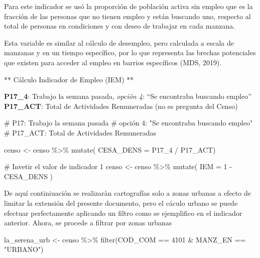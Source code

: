 \documentclass[
  letterpaper,
  DIV=11,
  numbers=noendperiod]{scrreprt}
\newenvironment{Shaded}{\begin{snugshade}}{\end{snugshade}}
\newcommand{\AttributeTok}[1]{\textcolor[rgb]{0.40,0.45,0.13}{#1}}
\newcommand{\CommentTok}[1]{\textcolor[rgb]{0.37,0.37,0.37}{#1}}
\newcommand{\DecValTok}[1]{\textcolor[rgb]{0.68,0.00,0.00}{#1}}
\newcommand{\FunctionTok}[1]{\textcolor[rgb]{0.28,0.35,0.67}{#1}}
\newcommand{\NormalTok}[1]{\textcolor[rgb]{0.00,0.23,0.31}{#1}}
\newcommand{\OtherTok}[1]{\textcolor[rgb]{0.00,0.23,0.31}{#1}}
\newcommand{\SpecialCharTok}[1]{\textcolor[rgb]{0.37,0.37,0.37}{#1}}
\newcommand{\StringTok}[1]{\textcolor[rgb]{0.13,0.47,0.30}{#1}}
\begin{document}
Para este indicador se usó la proporción de población activa sin empleo
que es la fracción de las personas que no tienen empleo y están buscando
uno, respecto al total de personas en condiciones y con deseo de
trabajar en cada manzana.

Esta variable es similar al cálculo de desempleo, pero calculada a
escala de manzanas y en un tiempo específico, por lo que representa las
brechas potenciales que existen para acceder al empleo en barrios
específicos (MDS, 2019).

** Cálculo Indicador de Empleo (IEM) **

\textbf{P17\_4}: Trabajo la semana pasada, \emph{opción 4}: ``Se
encontraba buscando empleo''\\
\textbf{P17\_ACT}: Total de Actividades Remuneradas (no es pregunta del
Censo)

\begin{Shaded}
\begin{Highlighting}[]
\CommentTok{\# P17: Trabajo la semana pasada}
\CommentTok{\# opción \textasciigrave{}4\textasciigrave{}: "Se encontraba buscando empleo"}
\CommentTok{\# P17\_ACT: Total de Actividades Remuneradas}

\NormalTok{censo }\OtherTok{\textless{}{-}}\NormalTok{ censo }\SpecialCharTok{\%\textgreater{}\%} \FunctionTok{mutate}\NormalTok{( }\AttributeTok{CESA\_DENS =}\NormalTok{ P17\_4 }\SpecialCharTok{/}\NormalTok{ P17\_ACT)}

\CommentTok{\# Invetir el valor de indicador 1}
\NormalTok{censo }\OtherTok{\textless{}{-}}\NormalTok{ censo }\SpecialCharTok{\%\textgreater{}\%} \FunctionTok{mutate}\NormalTok{( }\AttributeTok{IEM =} \DecValTok{1} \SpecialCharTok{{-}}\NormalTok{ CESA\_DENS )}
\end{Highlighting}
\end{Shaded}

De aquí continiuación se realizaràn cartografías solo a zonas urbanas a
efecto de limitar la extensión del presente documento, pero el cáculo
urbano se puede efectuar perfectamente aplicando un filtro como se
ejemplifico en el indicador anterior. Ahora, se procede a filtrar por
zonas urbanas

\begin{Shaded}
\begin{Highlighting}[]
\NormalTok{la\_serena\_urb }\OtherTok{\textless{}{-}}\NormalTok{ censo }\SpecialCharTok{\%\textgreater{}\%} \FunctionTok{filter}\NormalTok{(COD\_COM }\SpecialCharTok{==} \DecValTok{4101} \SpecialCharTok{\&}\NormalTok{ MANZ\_EN }\SpecialCharTok{==} \StringTok{"URBANO"}\NormalTok{)}
\end{Highlighting}
\end{Shaded}
\end{document}
